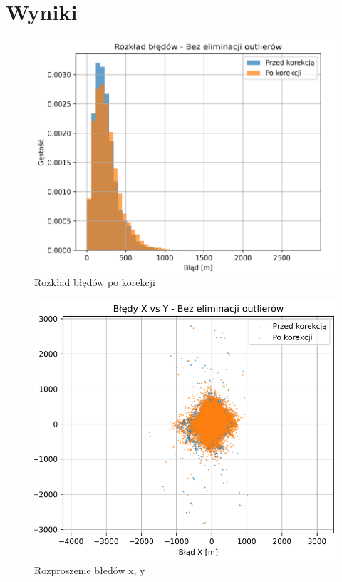 \documentclass{classrep}
\begin{document}
\clearpage{}
\section{Wyniki} {
  \begin{figure}[h!]
	  \centering
	  \includegraphics[scale=0.40]{gestoscBl.png}
	  \caption{Rozkład błędów po korekcji}
	  \label{fig:density}
  \end{figure}
  \begin{figure}[h!]
	  \centering
	  \includegraphics[scale=0.40]{rozkladBl.png}
	  \caption{Rozproszenie błedów x, y}

\end{figure}}
\end{document}
